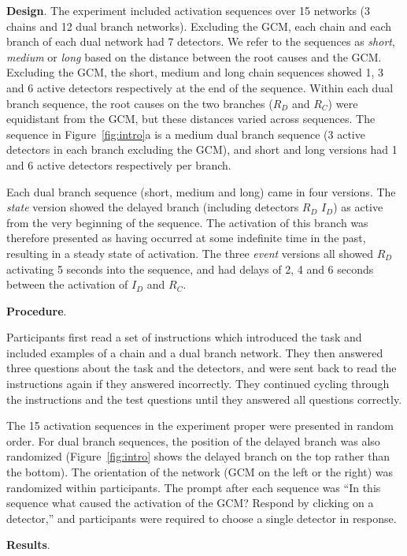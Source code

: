 \documentclass[10pt,letterpaper]{article}
\newcommand{\ev}[2]{$#1_#2$}
\begin{document}
\textbf{Design}.  The experiment included activation sequences over 15 networks (3 chains and 12 dual branch networks). Excluding the GCM, each chain and each branch of each dual network had 7 detectors. We refer to the sequences as \emph{short}, \emph{medium} or \emph{long} based on the distance between the root causes and the GCM. Excluding the GCM, the short, medium and long chain sequences showed 1, 3 and 6 active detectors respectively at the end of the sequence. Within each dual branch sequence, the root causes on the two branches (\ev{R}{D} and \ev{R}{C}) were equidistant from the GCM, but these distances varied across sequences. The sequence in Figure~\ref{fig:intro}a is a medium dual branch sequence (3 active detectors in each branch excluding the GCM), and short and long versions had 1 and 6 active detectors respectively per branch.

Each dual branch sequence (short, medium and long) came in four versions. The \emph{state} version showed the delayed branch (including detectors \ev{R}{D} \ev{I}{D}) as active from the very beginning of the sequence. The activation of this branch was therefore presented as having occurred at some indefinite time in the past, resulting in a steady state of activation. The three \emph{event} versions all showed \ev{R}{D} activating 5 seconds into the sequence, and had delays of 2, 4 and 6 seconds between the activation of \ev{I}{D} and \ev{R}{C}.


\textbf{Procedure}. 

Participants first read a set of instructions which introduced the task and included examples of a chain and a dual branch network. They then answered three questions about the task and the detectors, and were sent back to read the instructions again if they answered incorrectly. They continued cycling through the instructions and the test questions until they answered all questions correctly.

The 15 activation sequences in the experiment proper were presented in random order. For dual branch sequences, the position of the delayed branch was also randomized (Figure~\ref{fig:intro} shows the delayed branch on the top rather than the bottom). The orientation of the network (GCM on the left or the right) was randomized within participants.  The prompt after each sequence was ``In this sequence what caused the activation of the GCM? Respond by clicking on a detector,'' and participants were required to choose a single detector in response. 

\textbf{Results}. 
\end{document}
